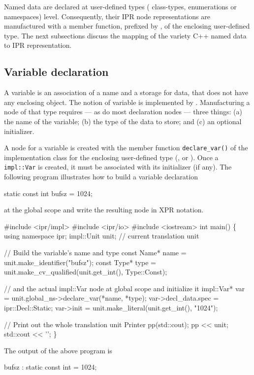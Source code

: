 \documentclass[11pt]{article}
\begin{document}
Named data are declared at user-defined types (\ie{} class-types,
enumerations or namespaces) level.  Consequently, their IPR node
representations are  manufactured with a member function, prefixed by
, of the enclosing user-defined type. The next subsections
discuss the mapping of the variety C++ named data to IPR representation.

\subsection{Variable declaration}
\label{sec:decl.variable}

A variable is an association of a name and a storage for data, that does not
have any enclosing object. The notion of variable is implemented by
.  Manufacturing a node of that type requires ---
as do most declaration nodes --- three things: (a) the name of the variable;
(b) the type of the data to store; and (c) an optional initializer.

A node for a variable is created with the member function
\texttt{declare\_var()} of the implementation class for the enclosing
user-defined type (,  or
).  Once a \texttt{impl::Var} is
created, it must be 
associated with its initializer (if any).  The following program
illustrates how to build a variable declaration 
\begin{Program}
  static const int bufsz = 1024;
\end{Program}
at the global scope and write the resulting node in XPR notation.
\begin{Program}
#include <ipr/impl>
#include <ipr/io>
#include <iostream>
int main()
\{
   using namespace ipr;
   impl::Unit unit;              // current translation unit
   
   // Build the variable's name and type
   const Name* name = unit.make_identifier("bufsz");
   const Type* type = unit.make_cv_qualified(unit.get_int(), Type::Const);

   // and the actual impl::Var node at global scope and initialize it
   impl::Var* var = unit.global_ns->declare_var(*name, *type);
   var->decl_data.spec = ipr::Decl::Static;
   var->init = unit.make_literal(unit.get_int(), "1024");
   
   // Print out the whole translation unit
   Printer pp(std::cout);
   pp << unit;
   std::cout << '';
\}
\end{Program}
The output of the above program is
\begin{Output}
  bufsz : static const int = 1024;
\end{Output}
\end{document}
